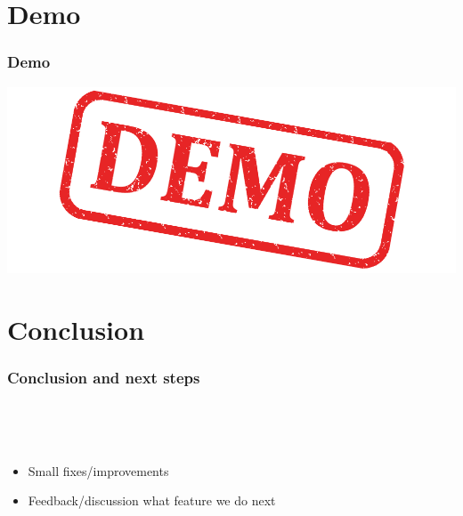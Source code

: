 \section{Demo}

\begin{frame}
  \frametitle{Demo}
  \includegraphics[width=\textwidth]{images/demo}
\end{frame}

\section{Conclusion}

\begin{frame}
  \frametitle{Conclusion and next steps}
  \begin{description}[]
    \item[Conclusion] \hfill \\
    \begin{block}{}
    \end{block}
    \item[Next Steps] \hfill \\
      \begin{itemize}
        \item Small fixes/improvements
        \item Feedback/discussion what feature we do next
      \end{itemize}
  \end{description} 
\end{frame}


